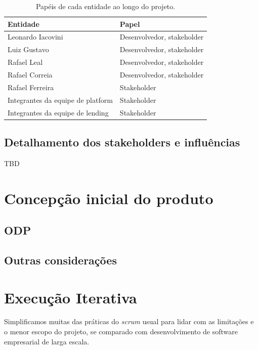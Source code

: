         \begin{table}[ht]
            \centering
            \caption{Papéis de cada entidade ao longo do projeto.}
            \begin{tabular}{l l}
                Entidade                            & Papel \\
                \hline
                Leonardo Iacovini                   &  Desenvolvedor, stakeholder  \\
                Luiz Gustavo                        &  Desenvolvedor, stakeholder  \\
                Rafael Leal                           &  Desenvolvedor, stakeholder \\
                Rafael Correia                      &  Desenvolvedor, stakeholder \\
                Rafael Ferreira                     &  Stakeholder \\
                Integrantes da equipe de platform   &  Stakeholder \\
                Integrantes da equipe de lending    &  Stakeholder 
            \end{tabular}
            \label{tab:roles}
        \end{table}
        \subsection{Detalhamento dos stakeholders e influências}
            TBD

    \section{Concepção inicial do produto}
        \subsection{ODP}
        \subsection{Outras considerações}

    \section{Execução Iterativa}
        Simplificamos muitas das práticas do \textit{scrum} usual para lidar com as limitações e o menor escopo do projeto, se comparado com desenvolvimento de software empresarial de larga escala.
        
